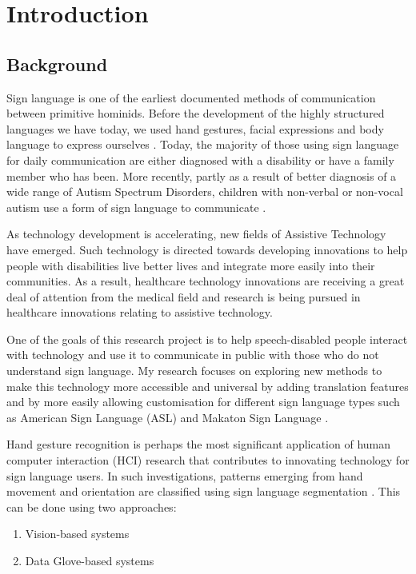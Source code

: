 \chapter{Introduction}

\section{Background}

Sign language is one of the earliest documented methods of communication between primitive hominids. Before the development of the highly structured languages we have today, we used hand gestures, facial expressions and body language to express ourselves \parencite{Premaratne2010}. Today, the majority of those using sign language for daily communication are either diagnosed with a disability or have a family member who has been. More recently, partly as a result of better diagnosis of a wide range of Autism Spectrum Disorders, children with non-verbal or non-vocal autism use a form of sign language to communicate \parencite{bonvillian1981sign}.

As technology development is accelerating, new fields of Assistive Technology have emerged. Such technology is directed towards developing innovations to help people with disabilities live better lives and integrate more easily into their communities. As a result, healthcare technology innovations are receiving a great deal of attention from the medical field and research is being pursued in healthcare innovations relating to assistive technology.

One of the goals of this research project is to help speech-disabled people interact with technology and use it to communicate in public with those who do not understand sign language. My research focuses on exploring new methods to make this technology more accessible and universal by adding translation features and by more easily allowing customisation for different sign language types such as American Sign Language (ASL) and Makaton Sign Language \parencite{Makaton}. 

Hand gesture recognition is perhaps the most significant application of human computer interaction (HCI) research that contributes to innovating technology for sign language users. In such investigations, patterns emerging from hand movement and orientation are classified using sign language segmentation \parencite{Han2009}. This can be done using two approaches:

\begin{enumerate}
    \item{Vision-based systems}
    \item{Data Glove-based systems}
\end{enumerate}

